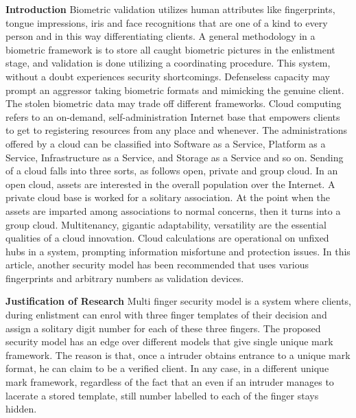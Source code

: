 \documentclass[12pt]{article}
\begin{document}
\textbf{\large  Introduction} \newline \newline \newline
Biometric validation utilizes human attributes like fingerprints, tongue impressions, iris and face recognitions that are one of a kind to every person and in this way differentiating clients. A general methodology in a biometric framework is to store all caught biometric pictures in the enlistment stage, and validation is done utilizing a coordinating procedure. This system, without a doubt experiences security shortcomings. Defenseless capacity may prompt an aggressor taking biometric formats and mimicking the genuine client. The stolen biometric data may trade off different frameworks. Cloud computing refers to an on-demand, self-administration Internet base that empowers clients to get to registering resources from any place and whenever. The administrations offered by a cloud can be classified into Software as a Service, Platform as a Service, Infrastructure as a Service, and Storage as a Service and so on. Sending of a cloud falls into three sorts, as follows open, private and group cloud. In an open cloud, assets are interested in the overall population over the Internet. A private cloud base is worked for a solitary association. At the point when the assets are imparted among associations to normal concerns, then it turns into a group cloud. Multitenancy, gigantic adaptability, versatility are the essential qualities of a cloud innovation. Cloud calculations are operational on unfixed hubs in a system, prompting information misfortune and protection issues. In this article, another security model has been recommended that uses various fingerprints and arbitrary numbers as validation devices. \newpage

\textbf{\large Justification of Research} \newline \newline 
Multi finger security model is a system where clients, during enlistment can enrol with three finger templates of their decision and assign a solitary digit number for each of these three fingers. The proposed security model has an edge over different models that give single unique mark framework. The reason is that, once a intruder obtains entrance to a unique mark format, he can claim to be a verified client. In any case, in a different unique mark framework, regardless of the fact that an even if an intruder manages to lacerate a stored template, still number labelled to each of the finger stays hidden. \newline \newline 
\end{document}
